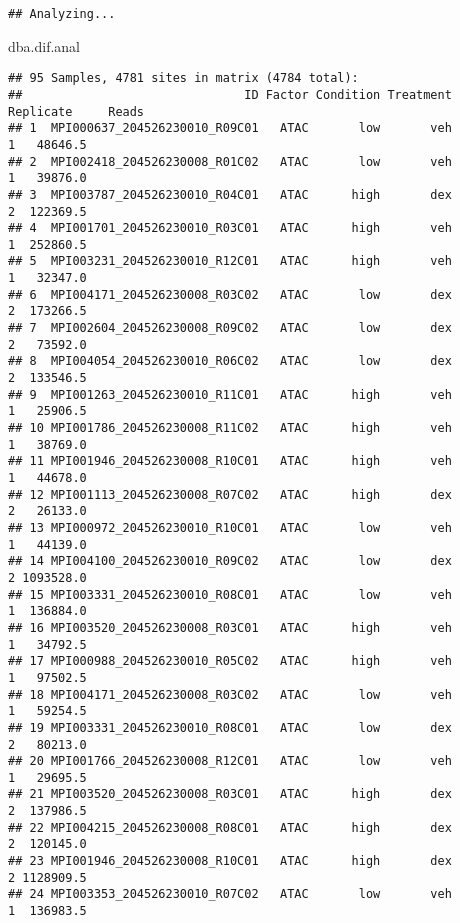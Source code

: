 \documentclass[
]{article}
\newenvironment{Shaded}{\begin{snugshade}}{\end{snugshade}}
\newcommand{\NormalTok}[1]{#1}
\begin{document}
\begin{verbatim}
## Analyzing...
\end{verbatim}

\begin{Shaded}
\begin{Highlighting}[]
\NormalTok{dba.dif.anal}
\end{Highlighting}
\end{Shaded}

\begin{verbatim}
## 95 Samples, 4781 sites in matrix (4784 total):
##                               ID Factor Condition Treatment Replicate     Reads
## 1  MPI000637_204526230010_R09C01   ATAC       low       veh         1   48646.5
## 2  MPI002418_204526230008_R01C02   ATAC       low       veh         1   39876.0
## 3  MPI003787_204526230010_R04C01   ATAC      high       dex         2  122369.5
## 4  MPI001701_204526230010_R03C01   ATAC      high       veh         1  252860.5
## 5  MPI003231_204526230010_R12C01   ATAC      high       veh         1   32347.0
## 6  MPI004171_204526230008_R03C02   ATAC       low       dex         2  173266.5
## 7  MPI002604_204526230008_R09C02   ATAC       low       dex         2   73592.0
## 8  MPI004054_204526230010_R06C02   ATAC       low       dex         2  133546.5
## 9  MPI001263_204526230010_R11C01   ATAC      high       veh         1   25906.5
## 10 MPI001786_204526230008_R11C02   ATAC      high       veh         1   38769.0
## 11 MPI001946_204526230008_R10C01   ATAC      high       veh         1   44678.0
## 12 MPI001113_204526230008_R07C02   ATAC      high       dex         2   26133.0
## 13 MPI000972_204526230010_R10C01   ATAC       low       veh         1   44139.0
## 14 MPI004100_204526230010_R09C02   ATAC       low       dex         2 1093528.0
## 15 MPI003331_204526230010_R08C01   ATAC       low       veh         1  136884.0
## 16 MPI003520_204526230008_R03C01   ATAC      high       veh         1   34792.5
## 17 MPI000988_204526230010_R05C02   ATAC      high       veh         1   97502.5
## 18 MPI004171_204526230008_R03C02   ATAC       low       veh         1   59254.5
## 19 MPI003331_204526230010_R08C01   ATAC       low       dex         2   80213.0
## 20 MPI001766_204526230008_R12C01   ATAC       low       veh         1   29695.5
## 21 MPI003520_204526230008_R03C01   ATAC      high       dex         2  137986.5
## 22 MPI004215_204526230008_R08C01   ATAC      high       dex         2  120145.0
## 23 MPI001946_204526230008_R10C01   ATAC      high       dex         2 1128909.5
## 24 MPI003353_204526230010_R07C02   ATAC       low       veh         1  136983.5

\end{verbatim}
\end{document}
